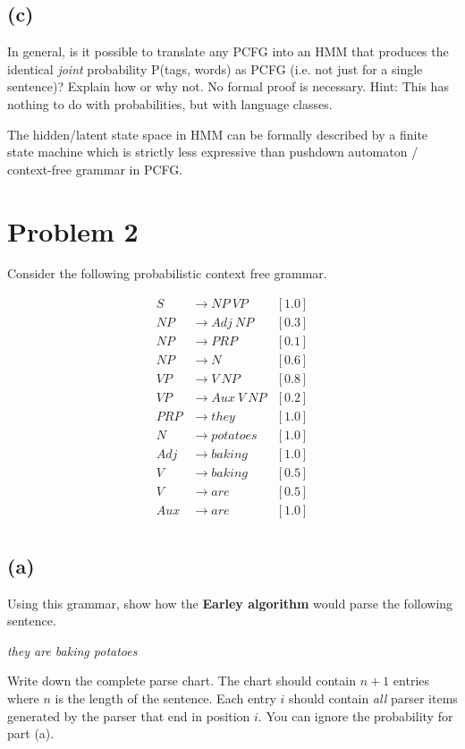 \documentclass[twoside,11pt]{homework}
\begin{document}
\subsection*{(c)}
\begin{prob}
  In general, is it possible to translate any PCFG into an HMM that produces the
  identical \textit{joint} probability P(tags, words) as PCFG (i.e. not just for
  a single sentence)? Explain how or why not. No formal proof is necessary.
  Hint: This has nothing to do with probabilities, but with language classes.
\end{prob}
\begin{solution}
  The hidden/latent state space in HMM can be formally described
  by a finite state machine which is strictly less expressive than pushdown
  automaton / context-free grammar in PCFG.
\end{solution}

\section*{Problem 2}

Consider the following probabilistic context free grammar.

\[
  \begin{aligned}
    S &\rightarrow NP\ VP &[1.0]\\
    NP &\rightarrow Adj\ NP &[0.3]\\
    NP &\rightarrow PRP &[0.1]\\
    NP &\rightarrow N &[0.6]\\
    VP &\rightarrow V\ NP &[0.8]\\
    VP &\rightarrow Aux\ V\ NP &[0.2]\\
    PRP &\rightarrow they &[1.0]\\
    N &\rightarrow potatoes &[1.0]\\
    Adj &\rightarrow baking &[1.0]\\
    V &\rightarrow baking &[0.5]\\
    V &\rightarrow are &[0.5]\\
    Aux &\rightarrow are &[1.0]\\
  \end{aligned}
\]

\subsection*{(a)}
\begin{prob}
  Using this grammar, show how the \textbf{Earley algorithm} would parse the
  following sentence.

  \textit{they are baking potatoes}

  Write down the complete parse chart.
  The chart should contain $n + 1$ entries where $n$ is the length of the
  sentence.
  Each entry $i$ should contain \textit{all} parser items generated by the
  parser that end in position $i$.
  You can ignore the probability for part (a).
\end{prob}
\end{document}
